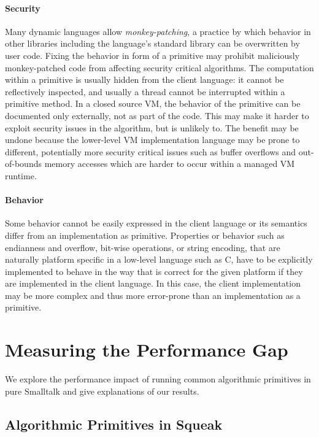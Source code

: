 \documentclass[
10pt,          %
]{sigplanconf}
\begin{document}
\paragraph{Security}
Many dynamic languages allow \emph{monkey-patching}, a practice by which
behavior in other libraries including the language's standard library can be
overwritten by user code. Fixing the behavior in form of a primitive may
prohibit maliciously monkey-patched code from affecting security critical
algorithms. The computation within a primitive is usually hidden from the
client language: it cannot be reflectively inspected, and usually a thread
cannot be interrupted within a primitive method. In a closed source \ac{VM},
the behavior of the primitive can be documented only externally, not as part of
the code. This may make it harder to exploit security issues in the algorithm,
but is unlikely to. The benefit may be undone because the lower-level \ac{VM}
implementation language may be prone to different, potentially more security
critical issues such as buffer overflows and out-of-bounds memory accesses
which are harder to occur within a managed \ac{VM} runtime.

\paragraph{Behavior}
Some behavior cannot be easily expressed in the client language or its
semantics differ from an implementation as primitive. Properties or behavior
such as endianness and overflow, bit-wise operations, or string encoding, that
are naturally platform specific in a low-level language such as C, have to be
explicitly implemented to behave in the way that is correct for the given
platform if they are implemented in the client language. In this case, the
client implementation may be more complex and thus more error-prone than an
implementation as a primitive.

\section{Measuring the Performance Gap}
\label{sec:measurements}

We explore the performance impact of running common algorithmic
primitives in pure Smalltalk and give explanations of our results.

\subsection{Algorithmic Primitives in Squeak}
\label{sec:algor-prim-sque}
\end{document}
